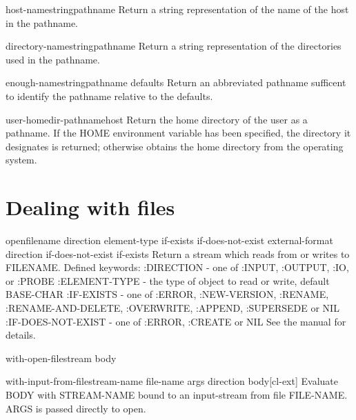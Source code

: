 \documentclass[10pt,english]{book}
\begin{document}
\begin{function}{host-namestring}{pathname}
  Return a string representation of the name of the host in the pathname.
\end{function}

\begin{function}{directory-namestring}{pathname}
  Return a string representation of the directories used in the pathname.
\end{function}

\begin{function}{enough-namestring}{pathname \op defaults}
  Return an abbreviated pathname sufficent to identify the pathname relative
   to the defaults.
\end{function}

\begin{function}{user-homedir-pathname}{\op host}
  Return the home directory of the user as a pathname. If the HOME
environment variable has been specified, the directory it designates
is returned; otherwise obtains the home directory from the operating
system.
\end{function}

\section{Dealing with files}
\label{sec:dealing-with-files}

\begin{function}{open}{filename \key direction element-type if-exists if-does-not-exist
 external-format \aux direction if-does-not-exist if-exists}
  Return a stream which reads from or writes to FILENAME.
  Defined keywords:
   :DIRECTION - one of :INPUT, :OUTPUT, :IO, or :PROBE
   :ELEMENT-TYPE - the type of object to read or write, default BASE-CHAR
   :IF-EXISTS - one of :ERROR, :NEW-VERSION, :RENAME, :RENAME-AND-DELETE,
                       :OVERWRITE, :APPEND, :SUPERSEDE or NIL
   :IF-DOES-NOT-EXIST - one of :ERROR, :CREATE or NIL
  See the manual for details.
\end{function}

\begin{macro}{with-open-file}{stream \body body}
  
\end{macro}

\begin{macro}{with-input-from-file}{stream-name file-name \rest args
    \key direction \akeys \body body}[cl-ext]
  Evaluate BODY with STREAM-NAME bound to an input-stream from file
FILE-NAME. ARGS is passed directly to open.
\end{macro}
\end{document}
